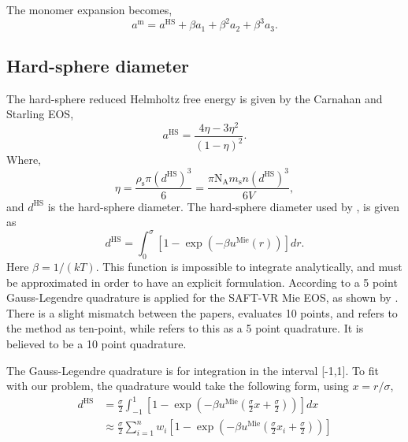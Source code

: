 \documentclass[english]{../thermomemo/thermomemo}
\newcommand*{\lb}{\left(}
\newcommand*{\rb}{\right)}
\newcommand{\mie}{\text{Mie}\xspace}
\newcommand{\hs}{\text{HS}\xspace}
\newcommand{\ms}{\ensuremath{\text{m}}\xspace}
\newcommand{\seg}{\ensuremath{\text{s}}\xspace}
\newcommand{\NA}{\ensuremath{\text{N}_{\text{A}}}\xspace}
\begin{document}
The monomer expansion becomes,
\begin{equation}
  \label{eq:a_m}
  a^\ms = a^\hs + \beta a_1 + \beta^2 a_2 + \beta^3 a_3 .
\end{equation}

\subsection{Hard-sphere diameter}
The hard-sphere reduced Helmholtz free energy is given by the Carnahan and Starling EOS,
\begin{equation}
  \label{eq:a_hs}
  a^\hs = \frac{4 \eta - 3 \eta^2}{\lb 1-\eta\rb^2}.
\end{equation}
Where,
\begin{equation}
  \label{eq:eta}
  \eta = \frac{\rho_\seg \pi \lb d^\hs \rb^3}{6} = \frac{ \pi \NA m_\seg n \lb d^\hs \rb^3}{6 V},
\end{equation}
and $d^\hs$ is the hard-sphere diameter. The hard-sphere diameter used
by \cite{Lafitte2013}, is given as
\begin{equation}
  \label{eq:d_hs}
  d^\hs = \int_0^\sigma \left[ 1-\exp\lb-\beta u^\mie\lb r\rb \rb \right] dr.
\end{equation}
Here $\beta=1/\lb kT \rb$. This function is impossible to integrate
analytically, and must be approximated in order to have an explicit
formulation. According to \citet{Papaioannou2014} a 5 point
Gauss-Legendre quadrature is applied for the SAFT-VR Mie EOS, as shown
by \citet{Paricaud2006}. There is a slight mismatch between the
papers, \citet{Paricaud2006} evaluates 10 points, and refers to the
method as ten-point, while \citet{Papaioannou2014} refers to this as a
5 point quadrature. It is believed to be a 10 point quadrature.

The Gauss-Legendre quadrature is for integration in the interval
[-1,1]. To fit with our problem, the quadrature would take the
following form, using $x = r/\sigma$,
\begin{align}
  \label{eq:d_approx}
  d^\hs &= \frac{\sigma}{2}\int_{-1}^1 \left[ 1 -\exp\lb-\beta u^\mie\lb \frac{\sigma}{2}x + \frac{\sigma}{2}\rb \rb \right] dx\\
  &\approx  \frac{\sigma}{2} \sum_{i=1}^n w_i \left[ 1 -\exp\lb-\beta u^\mie\lb \frac{\sigma}{2}x_i + \frac{\sigma}{2}\rb \rb \right]
\end{align}
\end{document}
